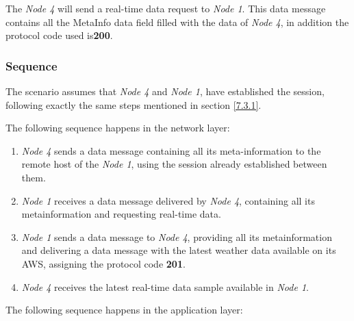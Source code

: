 The \emph{Node  4} will send a real-time data request to \emph{Node 1}. This data message contains all the MetaInfo data field filled with the data of \emph{Node  4},  in addition the protocol code used is\textbf{200}.

\subsubsection{Sequence}

The scenario assumes that \emph{Node 4} and \emph{Node 1}, have established the session, following exactly the same steps mentioned in section \ref{7.3.1}.

The following sequence happens in the network layer:

\begin{enumerate}

\item \emph{Node 4} sends a data message containing all its meta-information to the remote host of the \emph{Node 1}, using the session already established between them.

\item \emph{Node 1} receives a data message delivered by \emph{Node 4}, containing all its metainformation and requesting real-time data.

\item \emph{Node 1} sends a data message  to \emph{Node 4}, providing all its metainformation and delivering a data message with the latest weather data available on its \gls{AWS}, assigning the protocol code \textbf{201}.

\item \emph{Node 4} receives the latest real-time data sample available in \emph{Node 1}.

\end{enumerate}

The following sequence happens in the application layer:

